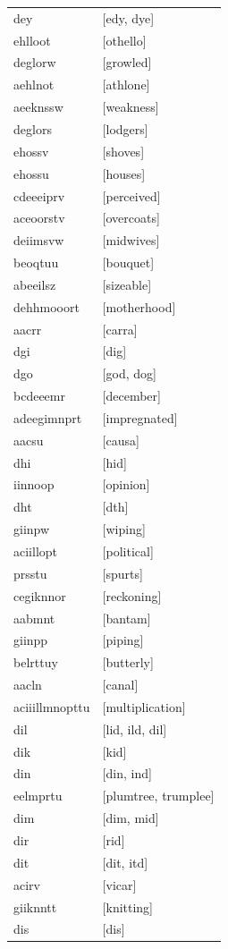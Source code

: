 \documentclass{article}
\begin{document}
\begin{tabular}{ll}
dey & [edy, dye] \\
ehlloot & [othello] \\
deglorw & [growled] \\
aehlnot & [athlone] \\
aeeknssw & [weakness] \\
deglors & [lodgers] \\
ehossv & [shoves] \\
ehossu & [houses] \\
cdeeeiprv & [perceived] \\
aceoorstv & [overcoats] \\
deiimsvw & [midwives] \\
beoqtuu & [bouquet] \\
abeeilsz & [sizeable] \\
dehhmooort & [motherhood] \\
aacrr & [carra] \\
dgi & [dig] \\
dgo & [god, dog] \\
bcdeeemr & [december] \\
adeegimnprt & [impregnated] \\
aacsu & [causa] \\
dhi & [hid] \\
iinnoop & [opinion] \\
dht & [dth] \\
giinpw & [wiping] \\
aciillopt & [political] \\
prsstu & [spurts] \\
cegiknnor & [reckoning] \\
aabmnt & [bantam] \\
giinpp & [piping] \\
belrttuy & [butterly] \\
aacln & [canal] \\
aciiillmnopttu & [multiplication] \\
dil & [lid, ild, dil] \\
dik & [kid] \\
din & [din, ind] \\
eelmprtu & [plumtree, trumplee] \\
dim & [dim, mid] \\
dir & [rid] \\
dit & [dit, itd] \\
acirv & [vicar] \\
giiknntt & [knitting] \\
dis & [dis] \\

\end{tabular}
\end{document}
